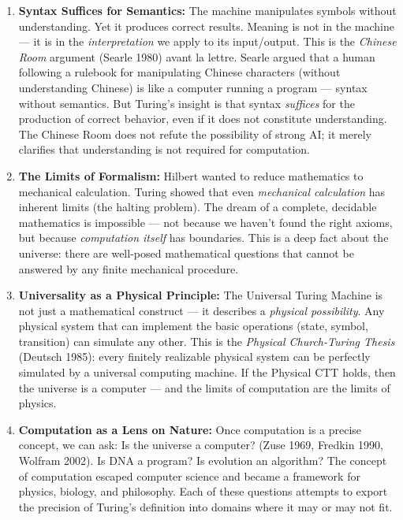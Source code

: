 \begin{enumerate}
\item \textbf{Syntax Suffices for Semantics:} The machine manipulates symbols without understanding. Yet it produces correct results. Meaning is not in the machine --- it is in the \emph{interpretation} we apply to its input/output. This is the \emph{Chinese Room} argument (Searle 1980) avant la lettre. Searle argued that a human following a rulebook for manipulating Chinese characters (without understanding Chinese) is like a computer running a program --- syntax without semantics. But Turing's insight is that syntax \emph{suffices} for the production of correct behavior, even if it does not constitute understanding. The Chinese Room does not refute the possibility of strong AI; it merely clarifies that understanding is not required for computation.

\item \textbf{The Limits of Formalism:} Hilbert wanted to reduce mathematics to mechanical calculation. Turing showed that even \emph{mechanical calculation} has inherent limits (the halting problem). The dream of a complete, decidable mathematics is impossible --- not because we haven't found the right axioms, but because \emph{computation itself} has boundaries. This is a deep fact about the universe: there are well-posed mathematical questions that cannot be answered by any finite mechanical procedure.

\item \textbf{Universality as a Physical Principle:} The Universal Turing Machine is not just a mathematical construct --- it describes a \emph{physical possibility}. Any physical system that can implement the basic operations (state, symbol, transition) can simulate any other. This is the \emph{Physical Church-Turing Thesis} (Deutsch 1985): every finitely realizable physical system can be perfectly simulated by a universal computing machine. If the Physical CTT holds, then the universe is a computer --- and the limits of computation are the limits of physics.

\item \textbf{Computation as a Lens on Nature:} Once computation is a precise concept, we can ask: Is the universe a computer? (Zuse 1969, Fredkin 1990, Wolfram 2002). Is DNA a program? Is evolution an algorithm? The concept of computation escaped computer science and became a framework for physics, biology, and philosophy. Each of these questions attempts to export the precision of Turing's definition into domains where it may or may not fit.


\end{enumerate}

